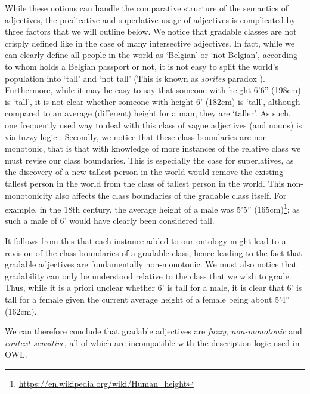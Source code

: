\documentclass[11pt]{article}
\begin{document}
While these notions can handle the comparative structure of the semantics of adjectives, the 
predicative and superlative usage of adjectives is complicated by three factors
that we will outline below. We notice that gradable classes are not 
crisply defined like in the case of many intersective adjectives. In fact, while we can clearly define all people in the world as `Belgian' or 
`not Belgian', according to whom holds a Belgian passport or not, it is not easy to
split the world's population into `tall' and `not tall' (This is known as \emph{sorites} paradox \cite{Bennett06kr}).
Furthermore, while it may 
be easy to say that someone with height 6'6'' (198cm) is `tall', it is not clear 
whether someone with height 6' (182cm) is `tall', although compared to an average (different)
height for a man, they are `taller'.
As such, one frequently used way to deal with this class of vague adjectives (and nouns) is via fuzzy logic \cite{Goguen1969fuzzy,Zadeh1975fuzzy,Zadeh1965fuzzy,DuboisPrade88en,Bennett06kr}.
Secondly, we notice that these class boundaries are 
non-monotonic, that is that with knowledge of more instances of the relative 
class we must revise our class boundaries. This is especially the case for superlatives, as the discovery of a new tallest person in the world would remove 
the existing tallest person in the world from the class of tallest person in the 
world. This non-monotonicity also affects the class boundaries of the gradable 
class itself. For example, in the 18th century, the average height of a male was 
5'5'' (165cm)\footnote{\url{https://en.wikipedia.org/wiki/Human_height}}; as such a male of 6' would have clearly been considered tall. 

It follows from this that each instance added to our ontology might lead to a revision of the class boundaries of a gradable class, hence leading to the fact that 
gradable adjectives are fundamentally non-monotonic. We must also notice 
that gradability can only be understood relative to the class that we wish to 
grade. Thus, while it is a priori unclear whether 6' is tall for a male, it is clear 
that 6' is tall for a female given the current average height of a female being about 5'4'' (162cm).

We can therefore conclude that gradable adjectives are \emph{fuzzy}, \emph{non-monotonic} 
and \emph{context-sensitive}, all of which are incompatible with the description 
logic used in OWL.
\end{document}
